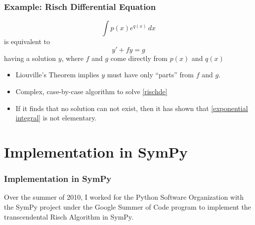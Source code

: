 \documentclass{beamer}
\numberwithin{equation}{section} %
\begin{document}
\begin{frame}
    \frametitle{Example: Risch Differential Equation}
    \pause
    \begin{equation}
    \label{exponential integral}
    \int{p(x)e^{q(x)}\,dx}
    \end{equation}
    is equivalent to 
    \begin{equation}
    \label{rischde}
    y' + fy = g
    \end{equation}
    having a solution $y$, where $f$ and $g$ come directly from $p(x)$
    and $q(x)$
    \pause
    \begin{itemize}
        \item Liouville's Theorem implies $y$ must have only ``parts''
        from $f$ and $g$.
        \pause
        \item Complex, case-by-case algorithm to solve \ref{rischde}
        \pause
        \item If it finds that no solution can not exist, then it has shown
        that \ref{exponential integral} is not elementary.
    \end{itemize}
\end{frame}

\section{Implementation in SymPy}

\begin{frame}
    \frametitle{Implementation in SymPy}
    \begin{figure}
   \end{figure}
    Over the summer of 2010, I worked for the Python Software
    Organization with the SymPy project under the Google Summer of Code
    program to implement the transcendental Risch Algorithm in SymPy.
\end{frame}
\end{document}
